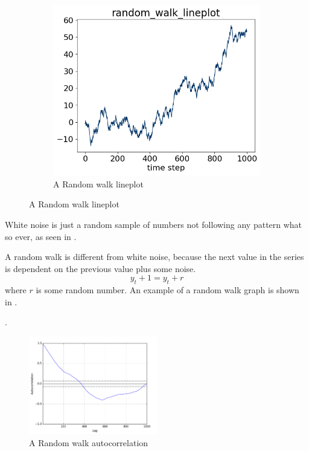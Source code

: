 \begin{figure}[H]
\begin{subfigure}[b]{0.4\textwidth}
    \includegraphics[width=\textwidth]{./figs/code_generated/data_exploration/random_walk_lineplot.png}
    \hfill
    \caption{A Random walk lineplot}
    \label{fig:dataset:random_walk}
  \end{subfigure}
\end{figure}



White noise is just a random sample of numbers not following any pattern what so ever, as seen in
.

A random walk is different from white noise, because the next value in the series is dependent on the previous value plus some noise.
\begin{equation}
  y_t+1 = y_t + r
  \label{eq:random_walk}
\end{equation}
where $r$ is some random number.
An example of a random walk graph is shown in .

.
\begin{figure}[H]
  \centering
  \includegraphics[width=0.5\textwidth]{./figs/illustrations/random_walk_autocorrelation.png}
  \hfill
  \caption{A Random walk autocorrelation}
  \label{fig:dataset:random_walk_autocorrelation}
\end{figure}

